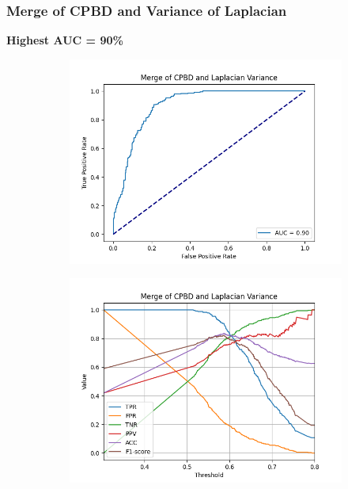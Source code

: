 \subsubsection{Merge of CPBD and Variance of Laplacian}
\textbf{Highest AUC = 90\%}
\begin{figure}[H]
    \centering
    \begin{subfigure}[t]{0.48\textwidth}
        \includegraphics[width=\textwidth]{Figures/BlurredImages/results_on_thresholds/output_roc_cpbd_lv.png}
        \caption{}
        \label{fig:CPBD_LV_roc}
    \end{subfigure}\hspace{1em}
    \begin{subfigure}[t]{0.48\textwidth}
        \includegraphics[width=\textwidth]{Figures/BlurredImages/results_on_thresholds/threshold_test_scores_cpbd_lv.png}

\end{subfigure}
\end{figure}
